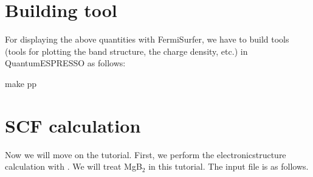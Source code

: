 \documentclass[letterpaper,10pt,pdftex,openany,english]{sphinxmanual}
\begin{document}
\section{Building   tool}
\label{\detokenize{qe:building-postprocess-tool}}
\sphinxAtStartPar
For displaying the above quantities with FermiSurfer,
we have to build  tools
(tools for plotting the band structure, the charge density, etc.)
in QuantumESPRESSO as follows:

\begin{sphinxVerbatim}[commandchars=\\\{\}]
\PYGZdl{} make pp
\end{sphinxVerbatim}


\section{SCF calculation}
\label{\detokenize{qe:scf-calculation}}
\sphinxAtStartPar
Now we will move on the tutorial.
First, we perform the electronic\sphinxhyphen{}structure calculation with .
We will treat MgB$_{\text{2}}$ in this tutorial.
The input file is as follows.

\sphinxAtStartPar
{}
\end{document}

